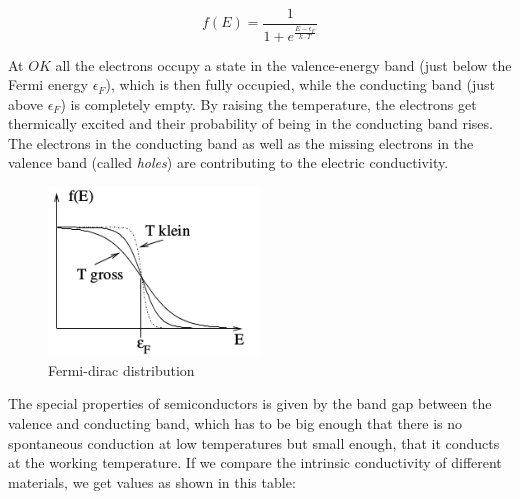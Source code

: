 \documentclass[11pt]{article}
\begin{document}
\begin{equation} 
\label{eq:Fermi}
f(E) = \frac{1}{1 + e^{\frac{E - \epsilon_F}{k \cdot T} } }
\end{equation}

At $OK$ all the electrons occupy a state in the valence-energy band (just below the Fermi energy $\epsilon_F$), which is then fully occupied, while the conducting band (just above $\epsilon_F$) is completely empty. By raising the temperature, the electrons get thermically excited and their probability of being in the conducting band rises. The electrons in the conducting band as well as the missing electrons in the valence band (called \textit{holes}) are contributing to the electric conductivity. 
\begin{figure}[H]
\centering
\includegraphics[width=0.5\textwidth]{fermi}%
\caption{Fermi-dirac distribution}
\label{fig:fermi}
\end{figure}


The special properties of semiconductors is given by the band gap between the valence and conducting band, which has to be big enough that there is no spontaneous conduction at low temperatures but small enough, that it conducts at the working temperature. If we compare the intrinsic conductivity of different materials, we get values as shown in this table: 

\end{document}
